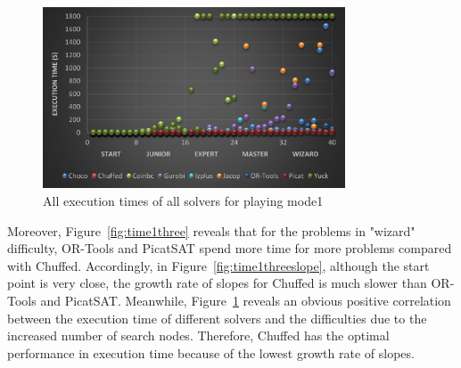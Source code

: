 \begin{figure}[htbp]
\centering
\includegraphics[width=0.8\textwidth]{figs/time1all.png}
\caption{All execution times of all solvers for playing mode1}
\label{fig:mode1time1}
\end{figure}
Moreover, Figure~\ref{fig:time1three} reveals that for the problems in "wizard" difficulty, OR-Tools and PicatSAT spend more time for more problems compared with Chuffed. Accordingly, in Figure~\ref{fig:time1threeslope}, although the start point is very close, the growth rate of slopes for Chuffed is much slower than OR-Tools and PicatSAT. Meanwhile, Figure~\ref{fig:mode1time1} reveals an obvious positive correlation between the execution time of different solvers and the difficulties due to the increased number of search nodes. Therefore, Chuffed has the optimal performance in execution time because of the lowest growth rate of slopes. 
